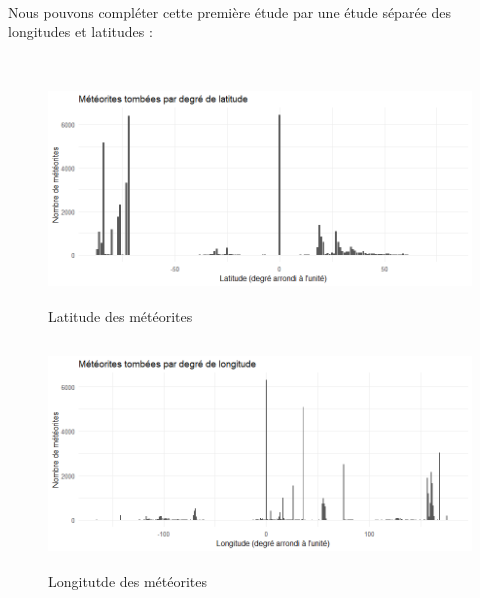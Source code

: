 \documentclass[12pt]{article}
\begin{document}
\\
Nous pouvons compléter cette première étude par une étude séparée des longitudes et latitudes :\\
\\
\begin{figure}[H]
\centering
\includegraphics[width=16cm,height=6cm]{Images/exploration/histogramme_latitude.png}
\caption{Latitude des météorites}
\end{figure}
\begin{figure}[H]
\centering
\includegraphics[width=16cm,height=6cm]{Images/exploration/histogramme_longitude.png}
\caption{Longitutde des météorites}
\end{figure}
\end{document}
